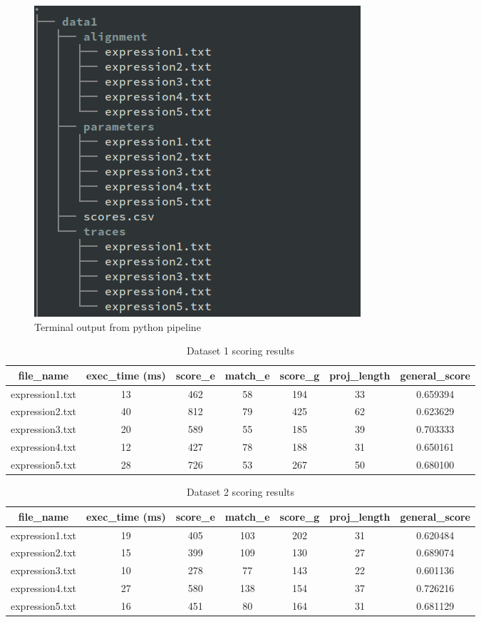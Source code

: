 \documentclass[12pt,a4paper]{article}
\begin{document}
\begin{figure}[H]
	\centering
	\includegraphics[width=0.45\linewidth]{img/terminal_tree.png}
	\caption{Terminal output from python pipeline}
	\label{fig:tree}
\end{figure}


\pagebreak


\begin{table}[H]
	\begin{center}
		\caption{Dataset 1 scoring results}
		\begin{tabular}{|c|c|c|c|c|c|c|}
			\hline
			\textbf{file\_name} & \textbf{exec\_time} (ms) & \textbf{score\_e} & \textbf{match\_e} & \textbf{score\_g} & \textbf{proj\_length} & \textbf{general\_score} \\
			\hline\hline
			expression1.txt & 13 & 462 & 58 & 194 & 33 & 0.659394 \\
			\hline
			expression2.txt & 40 & 812 & 79 & 425 & 62 & 0.623629 \\
			\hline
			expression3.txt & 20 & 589 & 55 & 185 & 39 & 0.703333 \\
			\hline
			expression4.txt & 12 & 427 & 78 & 188 & 31 & 0.650161 \\
			\hline
			expression5.txt & 28 & 726 & 53 & 267 & 50 & 0.680100 \\
			\hline
		\end{tabular}
	\end{center}
\end{table}

\begin{table}[H]
	\begin{center}
		\caption{Dataset 2 scoring results}
		\begin{tabular}{|c|c|c|c|c|c|c|}
			\hline
			\textbf{file\_name} & \textbf{exec\_time} (ms) & \textbf{score\_e} & \textbf{match\_e} & \textbf{score\_g} & \textbf{proj\_length} & \textbf{general\_score} \\
			\hline\hline
			expression1.txt & 19 & 405 & 103 & 202 & 31 & 0.620484 \\
			\hline
			expression2.txt & 15 & 399 & 109 & 130 & 27 & 0.689074 \\
			\hline
			expression3.txt & 10 & 278 & 77  & 143 & 22 & 0.601136 \\
			\hline
			expression4.txt & 27 & 580 & 138 & 154 & 37 & 0.726216 \\
			\hline
			expression5.txt & 16 & 451 & 80  & 164 & 31 & 0.681129 \\
			\hline
		\end{tabular}
	\end{center}
\end{table}
\end{document}
